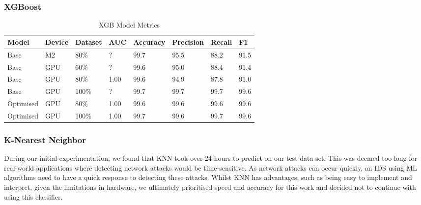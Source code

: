 \newpage

\subsubsection{XGBoost}
\label{sec:xgboost}


\begin{table}[h]
\centering
\caption{XGB Model Metrics}
\label{tab:xgb-metrics}
\begin{tabular}{|l|l|l|l|l|l|l|l|}
\hline
\textbf{Model} & \textbf{Device} & \textbf{Dataset} & \textbf{AUC} & \textbf{Accuracy} & \textbf{Precision} & \textbf{Recall} & \textbf{F1}  \\ \hline
Base & M2 & 80\% & ? & 99.7 & 95.5 & 88.2 & 91.5 \\ \hline
Base & GPU & 60\% & ? & 99.6 & 95.0 & 88.4 & 91.4 \\ \hline
Base & GPU & 80\% & 1.00 & 99.6 & 94.9 & 87.8 & 91.0 \\ \hline
Base & GPU & 100\% & ? & 99.7 & 99.7 & 99.7 & 99.6 \\ \hline
Optimised & GPU & 80\% & 1.00 & 99.6 & 99.6 & 99.6 & 99.6 \\ \hline
Optimised & GPU & 100\% & 1.00 & 99.7 & 99.6 & 99.7 & 99.6 \\ \hline
\end{tabular}
\end{table}

\subsubsection{K-Nearest Neighbor}

During our initial experimentation, we found that KNN took over 24 hours to predict on our test data set. This was deemed too long for real-world applications where detecting network attacks would be time-sensitive. As network attacks can occur quickly, an IDS using ML algorithms need to have a quick response to detecting these attacks.
Whilst KNN has advantages, such as being easy to implement and interpret, given the limitations in hardware, we ultimately prioritised speed and accuracy for this work and decided not to continue with using this classifier.